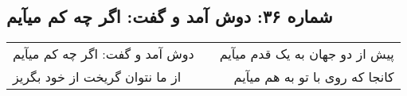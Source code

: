 \begin{center}
\section*{شماره ۳۶: دوش آمد و گفت: اگر چه کم میآیم}
\label{sec:036}
\begin{longtable}{l p{0.5cm} r}
دوش آمد و گفت: اگر چه کم میآیم
&&
پیش از دو جهان به یک قدم میآیم
\\
از ما نتوان گریخت از خود بگریز
&&
کانجا که روی با تو به هم میآیم
\\
\end{longtable}
\end{center}
